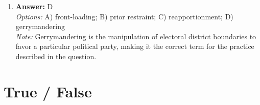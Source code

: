 \documentclass[12pt]{article}
\begin{document}
\begin{enumerate}[label=\arabic*.]
\\ \textit{Note:} Income equality is not considered a core value of American political culture, which typically emphasizes individualism, liberty, and equal opportunity rather than the redistribution of wealth.
\item \textbf{Answer:} D
\\ \textit{Options:} A) front-loading; B) prior restraint; C) reapportionment; D) gerrymandering
\\ \textit{Note:} Gerrymandering is the manipulation of electoral district boundaries to favor a particular political party, making it the correct term for the practice described in the question.
\end{enumerate}

\section*{True / False}
\end{document}
